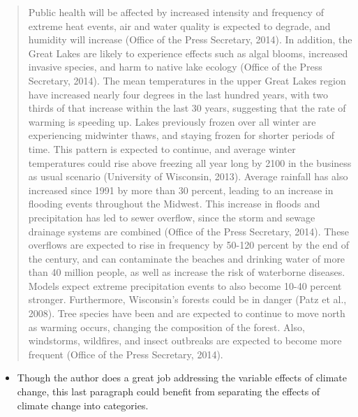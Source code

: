 \documentclass{article}\usepackage[]{graphicx}\usepackage[]{color}
\begin{document}
\begin{quote}
Public health will be affected by increased intensity and frequency of extreme heat events, air and water quality is expected to degrade, and humidity will increase (Office of the Press Secretary, 2014). In addition, the Great Lakes are likely to experience effects such as algal blooms, increased invasive species, and harm to native lake ecology (Office of the Press Secretary, 2014). The mean temperatures in the upper Great Lakes region have increased nearly four degrees in the last hundred years, with two thirds of that increase within the last 30 years, suggesting that the rate of warming is speeding up. Lakes previously frozen over all winter are experiencing midwinter thaws, and staying frozen for shorter periods of time. This pattern is expected to continue, and average winter temperatures could rise above freezing all year long by 2100 in the business as usual scenario (University of Wisconsin, 2013). Average rainfall has also increased since 1991 by more than 30 percent, leading to an increase in flooding events throughout the Midwest. This increase in floods and precipitation has led to sewer overflow, since the storm and sewage drainage systems are combined (Office of the Press Secretary, 2014). These overflows are expected to rise in frequency by 50-120 percent by the end of the century, and can contaminate the beaches and drinking water of more than 40 million people, as well as increase the risk of waterborne diseases. Models expect extreme precipitation events to also become 10-40 percent stronger. Furthermore, Wisconsin's forests could be in danger (Patz et al., 2008). Tree species have been and are expected to continue to move north as warming occurs, changing the composition of the forest. Also, windstorms, wildfires, and insect outbreaks are expected to become more frequent (Office of the Press Secretary, 2014). 
\end{quote}

\begin{itemize}
  \item Though the author does a great job addressing the variable effects of climate change, this last paragraph could benefit from separating the effects of climate change into categories. 
\end{itemize}
\end{document}
